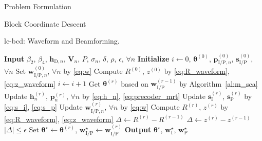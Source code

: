 \begin{section}{Problem Formulation}
\begin{subsection}{Block Coordinate Descent}
		\begin{algorithm}[!t]
			\caption{\gls{lc}-\gls{bcd}: Waveform and Beamforming.}
			\label{al:lc_bcd}
			\begin{algorithmic}[1]
				\State \textbf{Input} $\beta_2$, $\beta_4$, $\mathbf{h}_{\mathrm{D},n}$, $\mathbf{V}_{n}$, $P$, $\sigma_n$, $\delta$, $\rho$, $\epsilon$, $\forall n$
				\State \textbf{Initialize} $i \gets 0$, $\boldsymbol{\theta}^{(0)}$, $\mathbf{p}_{\mathrm{I/P},n}^{(0)}$, $\mathbf{s}_{\mathrm{I/P}}^{(0)}$, $\forall n$
				\State Set $\mathbf{w}_{\mathrm{I/P},n}^{(0)}$, $\forall n$ by \eqref{eq:w}
				\State Compute $R^{(0)}$, $z^{(0)}$ by \eqref{eq:R_waveform}, \eqref{eq:z_waveform}
				\Repeat
					\State $i \gets i + 1$
					\State Get $\boldsymbol{\theta}^{(r)}$ based on $\mathbf{w}_{\mathrm{I/P}}^{(r-1)}$ by Algorithm~\ref{al:m_sca}
					\State Update $\mathbf{h}_n^{(r)}$, $\mathbf{p}_n^{(r)}$, $\forall n$ by \eqref{eq:h_n}, \eqref{eq:precoder_mrt}
					\State Update $\mathbf{s}_{\mathrm{I}}^{(r)}$, $\mathbf{s}_{\mathrm{P}}^{(r)}$ by \eqref{eq:s_i}, \eqref{eq:s_p}
					\State Update $\mathbf{w}_{\mathrm{I/P},n}^{(r)}$, $\forall n$ by \eqref{eq:w}
					\State Compute $R^{(r)}$, $z^{(r)}$ by \eqref{eq:R_waveform}, \eqref{eq:z_waveform}
						\State $\Delta \gets R^{(r)} - R^{(r-1)}$
					\Else
						\State $\Delta \gets z^{(r)} - z^{(r-1)}$
					\EndIf
				\Until $\lvert \Delta \rvert \le \epsilon$
				\State Set $\boldsymbol{\theta}^{\star} \gets \boldsymbol{\theta}^{(r)}$, $\mathbf{w}_{\mathrm{I/P}}^{\star} \gets \mathbf{w}_{\mathrm{I/P}}^{(r)}$
				\State \textbf{Output} $\boldsymbol{\theta}^{\star}$, $\mathbf{w}_{\mathrm{I}}^{\star}$, $\mathbf{w}_{\mathrm{P}}^{\star}$
			\end{algorithmic}
		\end{algorithm}
	\end{subsection}
\end{section}


